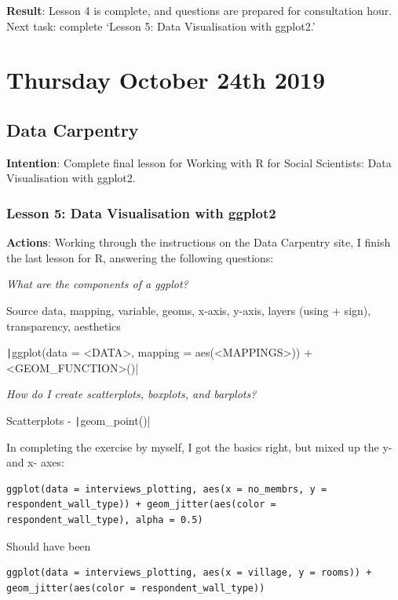 \documentclass{article}
\begin{document}
\textbf{Result}: Lesson 4 is complete, and questions are prepared for consultation hour. Next task: complete ‘Lesson 5: Data Visualisation with ggplot2.’

\newpage
\section{Thursday October 24th 2019}

\subsection{Data Carpentry}

\textbf{Intention}: Complete final lesson for Working with R for Social Scientists: Data Visualisation with ggplot2.

\subsubsection{Lesson 5: Data Visualisation with ggplot2}

\textbf{Actions}: Working through the instructions on the Data Carpentry site, I finish the last lesson for R, answering the following questions:

\textit{What are the components of a ggplot?}

Source data, mapping, variable, geoms, x-axis, y-axis, layers (using + sign), transparency, aesthetics

\texttt|ggplot(data = <DATA>, mapping = aes(<MAPPINGS>)) +  <GEOM_FUNCTION>()|

\textit{How do I create scatterplots, boxplots, and barplots?}

Scatterplots - \texttt|geom_point()|

In completing the exercise by myself, I got the basics right, but mixed up the y- and x- axes:

\begin{verbatim}
ggplot(data = interviews_plotting, aes(x = no_membrs, y = respondent_wall_type)) + geom_jitter(aes(color = respondent_wall_type), alpha = 0.5)
\end{verbatim}

Should have been
\begin{verbatim}
ggplot(data = interviews_plotting, aes(x = village, y = rooms)) + geom_jitter(aes(color = respondent_wall_type))
\end{verbatim}
\end{document}
